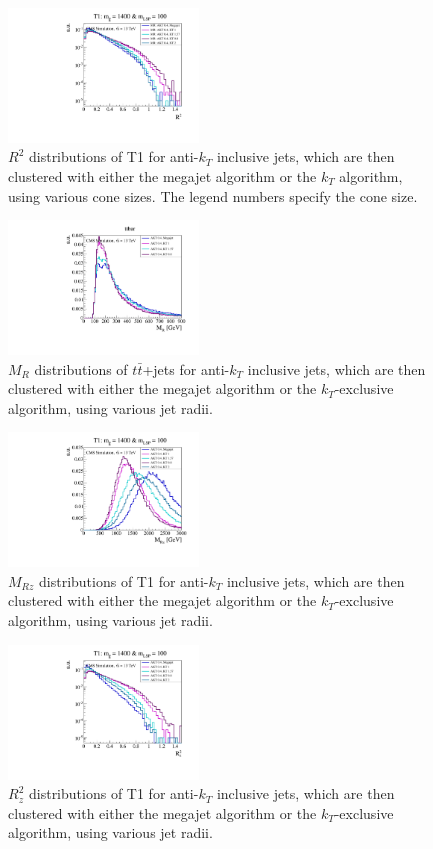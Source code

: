 \documentclass[twocolumn,aps,prd,reprint]{revtex4-1}
\begin{document}
\begin{figure}[h]
 \includegraphics[width=0.45\textwidth]{r2_cones_T1_1400_100_0_4.pdf}
\caption{\label{fig:t1_clstr_r2} $R^2$ distributions of T1 for anti-$k_T$ inclusive jets, which are then clustered with either the megajet algorithm or the $k_T$ algorithm, using various cone sizes. The legend numbers specify the cone size. }
\end{figure}
\begin{figure}
\includegraphics[width=0.45\textwidth]{cones_ttbar_0_4.pdf}
\caption{\label{fig:ttbar_clstr} $M_R$ distributions of $t\bar{t}$+jets for anti-$k_T$ inclusive jets, which are then clustered with either the megajet algorithm or the $k_T$-exclusive algorithm, using various jet radii. }
\end{figure}
\begin{figure}
 \includegraphics[width=0.45\textwidth]{z_cones_T1_1400_100_0_4.pdf}
\caption{\label{fig:t1_zclstr} $M_{Rz}$ distributions of T1 for anti-$k_T$ inclusive jets, which are then clustered with either the megajet algorithm or the $k_T$-exclusive algorithm, using various jet radii. }
\end{figure}
\begin{figure}
\includegraphics[width=0.45\textwidth]{z_r2_cones_T1_1400_100_0_4.pdf}
\caption{\label{fig:t1_zclstr_r2} $R^2_z$ distributions of T1 for anti-$k_T$ inclusive jets, which are then clustered with either the megajet algorithm or the $k_T$-exclusive algorithm, using various jet radii. }
\end{figure}
\end{document}

